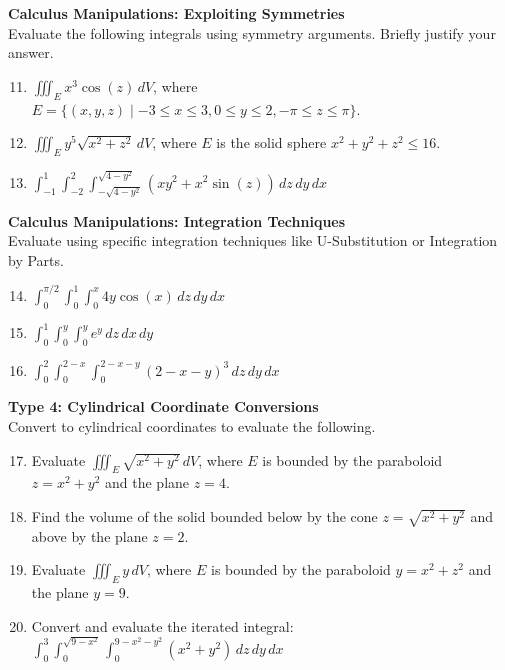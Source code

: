 \documentclass[11pt]{article}
\begin{document}
\textbf{Calculus Manipulations: Exploiting Symmetries} \\
Evaluate the following integrals using symmetry arguments. Briefly justify your answer.
\begin{enumerate}
\setcounter{enumi}{10}
    \item $\displaystyle \iiint_E x^3 \cos(z) \,dV$, where $E = \{(x,y,z) \mid -3 \le x \le 3, 0 \le y \le 2, -\pi \le z \le \pi\}$.
    \item $\displaystyle \iiint_E y^5 \sqrt{x^2+z^2} \,dV$, where $E$ is the solid sphere $x^2 + y^2 + z^2 \le 16$.
    \item $\displaystyle \int_{-1}^1 \int_{-2}^2 \int_{-\sqrt{4-y^2}}^{\sqrt{4-y^2}} (xy^2 + x^2 \sin(z)) \,dz\,dy\,dx$
\end{enumerate}

\textbf{Calculus Manipulations: Integration Techniques} \\
Evaluate using specific integration techniques like U-Substitution or Integration by Parts.
\begin{enumerate}
\setcounter{enumi}{13}
    \item $\displaystyle \int_0^{\pi/2} \int_0^1 \int_0^x 4y \cos(x) \,dz\,dy\,dx$
    \item $\displaystyle \int_0^1 \int_0^y \int_0^y e^y \,dz\,dx\,dy$
    \item $\displaystyle \int_0^2 \int_0^{2-x} \int_0^{2-x-y} (2-x-y)^3 \,dz\,dy\,dx$
\end{enumerate}

\textbf{Type 4: Cylindrical Coordinate Conversions} \\
Convert to cylindrical coordinates to evaluate the following.
\begin{enumerate}
\setcounter{enumi}{16}
    \item Evaluate $\displaystyle \iiint_E \sqrt{x^2+y^2} \,dV$, where $E$ is bounded by the paraboloid $z = x^2+y^2$ and the plane $z=4$.
    \item Find the volume of the solid bounded below by the cone $z = \sqrt{x^2+y^2}$ and above by the plane $z=2$.
    \item Evaluate $\displaystyle \iiint_E y \,dV$, where $E$ is bounded by the paraboloid $y = x^2+z^2$ and the plane $y=9$.
    \item Convert and evaluate the iterated integral: $\displaystyle \int_0^3 \int_0^{\sqrt{9-x^2}} \int_0^{9-x^2-y^2} (x^2+y^2) \,dz\,dy\,dx$
\end{enumerate}
\end{document}
